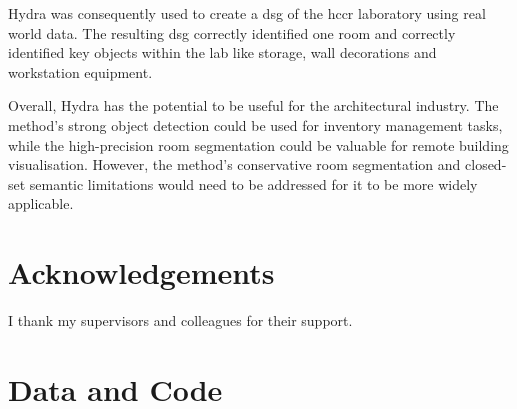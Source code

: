 {  Hydra was consequently used to create a \gls{dsg} of the \gls{hccr} laboratory using real world data. The resulting \gls{dsg} correctly identified one room and correctly identified key objects within the lab like storage, wall decorations and workstation equipment.

  Overall, Hydra has the potential to be useful for the architectural industry. The method's strong object detection could be used for inventory management tasks, while the high-precision room segmentation could be valuable for remote building visualisation. However, the method's conservative room segmentation and closed-set semantic limitations would need to be addressed for it to be more widely applicable.
}


\dedication{%
  To my family.%
}

\chapter{Acknowledgements}
I thank my supervisors and colleagues for their support.


\chapter{Data and Code}

